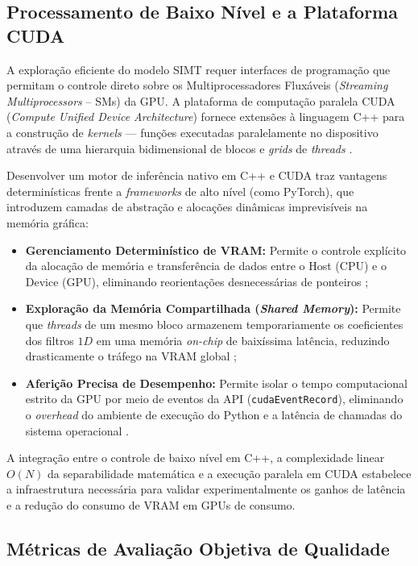 \documentclass[
    12pt,                %
    openright,           %
    oneside,             %
    a4paper,             %
    english,             %
    brazil               %
]{abntex2}
\begin{document}
\subsection{Processamento de Baixo Nível e a Plataforma CUDA}
\label{sec:plataforma_cuda}

A exploração eficiente do modelo SIMT requer interfaces de programação que permitam o controle direto sobre os Multiprocessadores Fluxáveis (\textit{Streaming Multiprocessors} -- SMs) da GPU. A plataforma de computação paralela CUDA (\textit{Compute Unified Device Architecture}) fornece extensões à linguagem C++ para a construção de \textit{kernels} --- funções executadas paralelamente no dispositivo através de uma hierarquia bidimensional de blocos e \textit{grids} de \textit{threads} \cite{NvidiaCUDA2025}.

Desenvolver um motor de inferência nativo em C++ e CUDA traz vantagens determinísticas frente a \textit{frameworks} de alto nível (como PyTorch), que introduzem camadas de abstração e alocações dinâmicas imprevisíveis na memória gráfica:

\begin{itemize}
    \item \textbf{Gerenciamento Determinístico de VRAM:} Permite o controle explícito da alocação de memória e transferência de dados entre o Host (CPU) e o Device (GPU), eliminando reorientações desnecessárias de ponteiros \cite{NvidiaCUDA2025};
    \item \textbf{Exploração da Memória Compartilhada (\textit{Shared Memory}):} Permite que \textit{threads} de um mesmo bloco armazenem temporariamente os coeficientes dos filtros $1D$ em uma memória \textit{on-chip} de baixíssima latência, reduzindo drasticamente o tráfego na VRAM global \cite{Kirk2023};
    \item \textbf{Aferição Precisa de Desempenho:} Permite isolar o tempo computacional estrito da GPU por meio de eventos da API (\texttt{cudaEventRecord}), eliminando o \textit{overhead} do ambiente de execução do Python e a latência de chamadas do sistema operacional \cite{NvidiaCUDA2025}.
\end{itemize}

A integração entre o controle de baixo nível em C++, a complexidade linear $O(N)$ da separabilidade matemática e a execução paralela em CUDA estabelece a infraestrutura necessária para validar experimentalmente os ganhos de latência e a redução do consumo de VRAM em GPUs de consumo.

\subsection{Métricas de Avaliação Objetiva de Qualidade}
\end{document}
